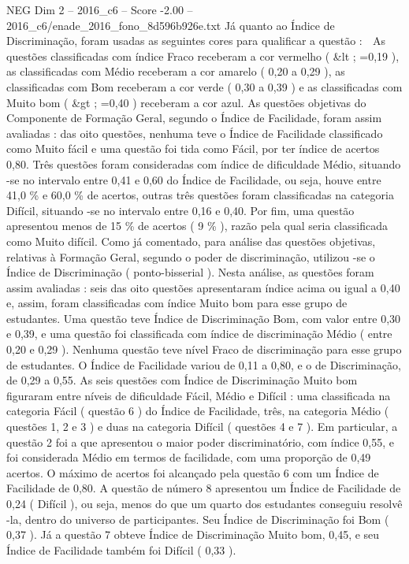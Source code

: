 \begin{textsample}{NEG Dim 2 – 2016\_c6 – Score -2.00 – 2016\_c6/enade\_2016\_fono\_8d596b926e.txt}
Já quanto ao Índice de Discriminação, foram usadas as seguintes cores para qualificar a questão :  As questões classificadas com índice Fraco receberam a cor vermelho ( \&lt ; =0,19 ), as classificadas com Médio receberam a cor amarelo ( 0,20 a 0,29 ), as classificadas com Bom receberam a cor verde ( 0,30 a 0,39 ) e as classificadas com Muito bom ( \&gt ; =0,40 ) receberam a cor azul.
As questões objetivas do Componente de Formação Geral, segundo o Índice de Facilidade, foram assim avaliadas : das oito questões, nenhuma teve o Índice de Facilidade classificado como Muito fácil e uma questão foi tida como Fácil, por ter índice de acertos 0,80.
Três questões foram consideradas com índice de dificuldade Médio, situando -se no intervalo entre 0,41 e 0,60 do Índice de Facilidade, ou seja, houve entre 41,0 \% e 60,0 \% de acertos, outras três questões foram classificadas na categoria Difícil, situando -se no intervalo entre 0,16 e 0,40.
Por fim, uma questão apresentou menos de 15 \% de acertos ( 9 \% ), razão pela qual seria classificada como Muito difícil.
Como já comentado, para análise das questões objetivas, relativas à Formação Geral, segundo o poder de discriminação, utilizou -se o Índice de Discriminação ( ponto-bisserial ).
Nesta análise, as questões foram assim avaliadas : seis das oito questões apresentaram índice acima ou igual a 0,40 e, assim, foram classificadas com índice Muito bom para esse grupo de estudantes.
Uma questão teve Índice de Discriminação Bom, com valor entre 0,30 e 0,39, e uma questão foi classificada com índice de discriminação Médio ( entre 0,20 e 0,29 ).
Nenhuma questão teve nível Fraco de discriminação para esse grupo de estudantes.
O Índice de Facilidade variou de 0,11 a 0,80, e o de Discriminação, de 0,29 a 0,55.
As seis questões com Índice de Discriminação Muito bom figuraram entre níveis de dificuldade Fácil, Médio e Difícil : uma classificada na categoria Fácil ( questão 6 ) do Índice de Facilidade, três, na categoria Médio ( questões 1, 2 e 3 ) e duas na categoria Difícil ( questões 4 e 7 ).
Em particular, a questão 2 foi a que apresentou o maior poder discriminatório, com índice 0,55, e foi considerada Médio em termos de facilidade, com uma proporção de 0,49 acertos.
O máximo de acertos foi alcançado pela questão 6 com um Índice de Facilidade de 0,80.
A questão de número 8 apresentou um Índice de Facilidade de 0,24 ( Difícil ), ou seja, menos do que um quarto dos estudantes conseguiu resolvê -la, dentro do universo de participantes.
Seu Índice de Discriminação foi Bom ( 0,37 ).
Já a questão 7 obteve Índice de Discriminação Muito bom, 0,45, e seu Índice de Facilidade também foi Difícil ( 0,33 ).

\end{textsample}
